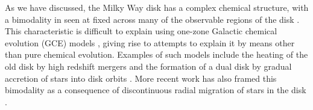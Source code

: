 
As we have discussed, the Milky Way disk has a complex chemical structure, with a bimodality in \afe{} seen at fixed \feh{} across many of the observable regions of the disk \citep{2003A&A...410..527B,2005A&A...433..185B,2014ApJ...796...38N,2015ApJ...808..132H}. This characteristic is difficult to explain using one-zone Galactic chemical evolution (GCE) models \citep[most recently shown by][]{2016arXiv160408613A}, giving rise to attempts to explain it by means other than pure chemical evolution. Examples of such models include the heating of the old disk by high redshift mergers \citep[e.g.][]{2004ApJ...612..894B,2008MNRAS.391.1806V,2009ApJ...700.1896K,2013A&A...558A...9M} and the formation of a dual disk by gradual accretion of stars into disk orbits \citep[e.g.][]{2003ApJ...597...21A}. More recent work has also framed this bimodality as a consequence of discontinuous radial migration of stars in the disk \citep{2016arXiv161009869T}. 


